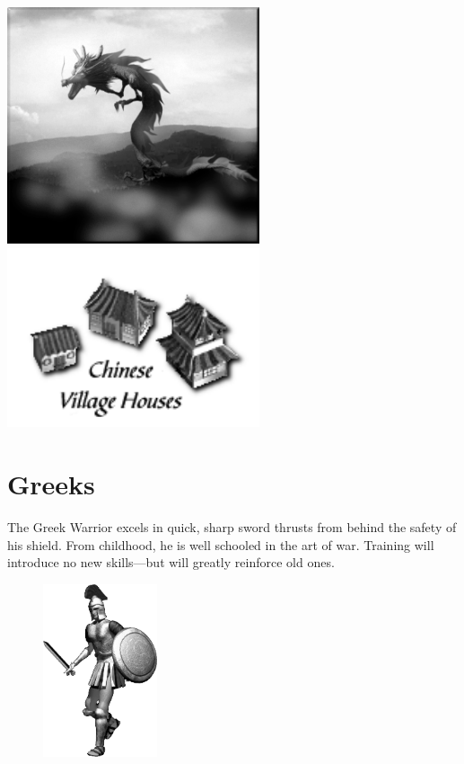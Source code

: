 \begin{center}
\includegraphics[width=74.25mm]{Ajingnung}\includegraphics[width=74.25mm]{Ichinesehouse}
\end{center}

\clearpage

\section{Greeks}

The Greek Warrior excels in quick, sharp sword thrusts from behind the safety of his shield. From childhood, he is well schooled in the art of war. Training will introduce no new skills---but will greatly reinforce old ones.

\begin{figure}
	\begin{center}
		\vspace{-20pt}
		\includegraphics[width=0.3\textwidth]{Agreek}
	\end{center}
	\vspace{-20pt}
\end{figure}

